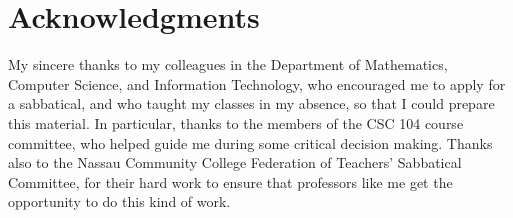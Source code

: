 
\chapter{Acknowledgments}

My sincere thanks to my colleagues in the Department of Mathematics, Computer Science, and Information Technology, who encouraged me to apply for a sabbatical, and who taught my classes in my absence, so that I could prepare this material.  In particular, thanks to the members of the CSC 104 course committee, who helped guide me during some critical decision making.  Thanks also to the Nassau Community College Federation of Teachers' Sabbatical Committee, for their hard work to ensure that professors like me get the opportunity to do this kind of work.